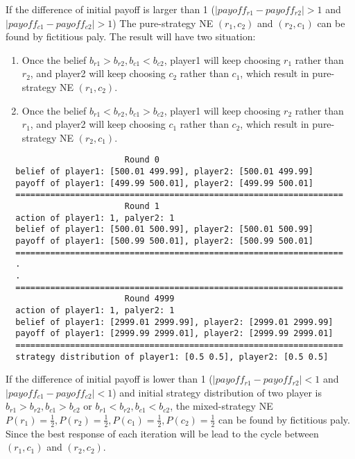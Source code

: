 \documentclass[a4paper, oneside, final, 12pt]{scrartcl} %
\begin{document}
\begingroup
\raggedright
If the difference of initial payoff is larger than 1
($|payoff_{r1} - payoff_{r2}| > 1$ and $|payoff_{c1} - payoff_{c2}| > 1$)
The pure-strategy NE $(r_1, c_2)$ and $(r_2, c_1)$ can be found by fictitious paly.
The result will have two situation:

\begin{enumerate}
  \item Once the belief $b_{r1} > b_{r2}, b_{c1} < b_{c2}$,
  player1 will keep choosing $r_1$ rather than $r_2$, 
  and player2 will keep choosing $c_2$ rather than $c_1$, 
  which result in pure-strategy NE $(r_1, c_2)$.
  \item Once the belief $b_{r1} < b_{r2}, b_{c1} > b_{c2}$,
  player1 will keep choosing $r_2$ rather than $r_1$, 
  and player2 will keep choosing $c_1$ rather than $c_2$, 
  which result in pure-strategy NE $(r_2, c_1)$.
\end{enumerate}
\endgroup

\begin{lstlisting}
                        Round 0
  belief of player1: [500.01 499.99], player2: [500.01 499.99]
  payoff of player1: [499.99 500.01], player2: [499.99 500.01]
  ==================================================================
                        Round 1
  action of player1: 1, palyer2: 1
  belief of player1: [500.01 500.99], player2: [500.01 500.99]
  payoff of player1: [500.99 500.01], player2: [500.99 500.01]
  ==================================================================
  .
  .
  ==================================================================
                        Round 4999
  action of player1: 1, palyer2: 1
  belief of player1: [2999.01 2999.99], player2: [2999.01 2999.99]
  payoff of player1: [2999.99 2999.01], player2: [2999.99 2999.01]
  ==================================================================
  strategy distribution of player1: [0.5 0.5], player2: [0.5 0.5]
\end{lstlisting}

\begingroup
\raggedright
If the difference of initial payoff is lower than 1
($|payoff_{r1} - payoff_{r2}| < 1$ and $|payoff_{c1} - payoff_{c2}| < 1$)
and initial strategy distribution of two player is 
$b_{r1} > b_{r2}, b_{c1} > b_{c2}$  or  $b_{r1} < b_{r2}, b_{c1} < b_{c2}$, 
the mixed-strategy NE $P(r_1) = \frac{1}{2}, P(r_2) = \frac{1}{2}, 
P(c_1) = \frac{1}{2}, P(c_2) = \frac{1}{2}$ can be found by fictitious paly.
Since the best response of each iteration will be lead to the cycle 
between $(r_1, c_1)$ and $(r_2, c_2)$.
\endgroup
\end{document}
